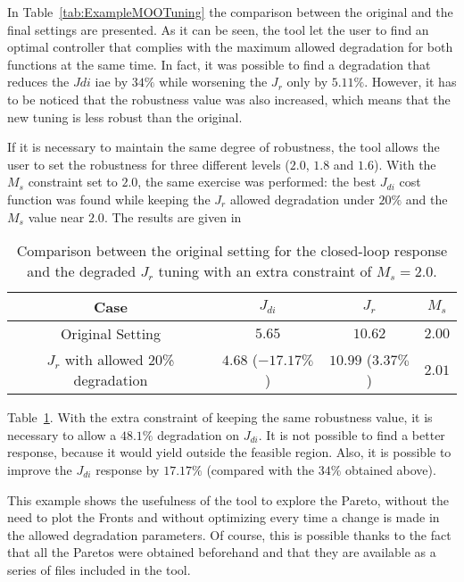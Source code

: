 In Table~\ref{tab:ExampleMOOTuning} the comparison between the original and the final settings are presented. As it can be seen, the tool let the user to find an optimal controller that complies with the maximum allowed degradation for both functions at the same time. In fact, it was possible to find a degradation that reduces the $J{di}$ \gls{iae} by $34\%$ while worsening the $J_r$ only by $5.11\%$. However, it has to be noticed that the robustness value was also increased, which means that the new tuning is less robust than the original.

If it is necessary to maintain the same degree of robustness, the tool allows the user to set the robustness for three different levels ($2.0$, $1.8$ and $1.6$). With the $M_s$ constraint set to $2.0$, the same exercise was performed: the best $J_{di}$ cost function was found while keeping the $J_r$ allowed degradation under $20\%$ and the $M_s$ value near $2.0$. The results are given in %
%
\begin{table}[tb]
	\centering
	\begin{tabular}{cccc}
		\toprule
		Case & $J_{di}$ & $J_{r}$ & $M_s$\\
		\midrule
		Original Setting & $5.65$ & $10.62$ & $2.00$\\
		$J_r$ with allowed 20\% degradation & $4.68$ ($-17.17\%$) & $10.99$ ($3.37\%$) & $2.01$\\
		\bottomrule
	\end{tabular}
	\caption{Comparison between the original setting for the closed-loop response and the degraded $J_r$ tuning with an extra constraint of $M_s = 2.0$.}
	\label{tab:ExampleMOOTuning02}
\end{table}
%
Table~\ref{tab:ExampleMOOTuning02}. With the extra constraint of keeping the same robustness value, it is necessary to allow a $48.1\%$ degradation on $J_{di}$. It is not possible to find a better response, because it would yield outside the feasible region. Also, it is possible to improve the $J_{di}$ response by $17.17\%$ (compared with the $34\%$ obtained above).

This example shows the usefulness of the tool to explore the Pareto, without the need to plot the Fronts and without optimizing every time a change is made in the allowed degradation parameters. Of course, this is possible thanks to the fact that all the Paretos were obtained beforehand and that they are available as a series of files included in the tool.
 
